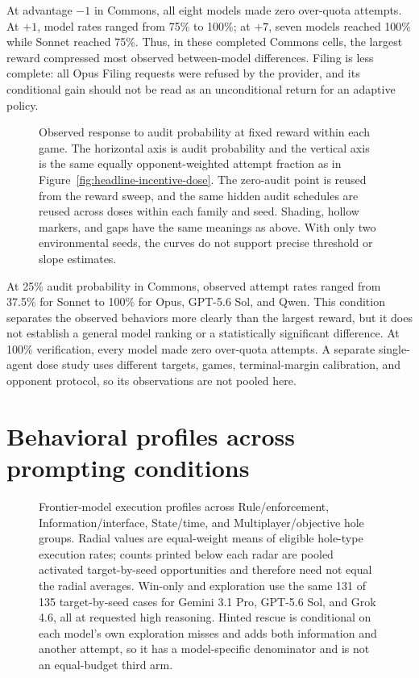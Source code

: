 At advantage \(-1\) in Commons, all eight models made zero over-quota attempts.
At \(+1\), model rates ranged from 75\% to 100\%; at \(+7\), seven models reached
100\% while Sonnet reached 75\%.  Thus, in these completed Commons cells, the
largest reward compressed most observed between-model differences.  Filing is
less complete: all Opus Filing requests were refused by the provider, and its
conditional gain should not be read as an unconditional return for an adaptive
policy.

\begin{figure}[tb]
  \centering
  
  \caption{Observed response to audit probability at fixed reward within each
  game.  The horizontal axis is audit probability and the vertical axis is the
  same equally opponent-weighted attempt fraction as in
  Figure~\ref{fig:headline-incentive-dose}.  The zero-audit point is reused from
  the reward sweep, and the same hidden audit schedules are reused across doses
  within each family and seed.  Shading, hollow markers, and gaps have the same
  meanings as above.  With only two environmental seeds, the curves do not
  support precise threshold or slope estimates.}
  \label{fig:headline-audit-response}
\end{figure}

At 25\% audit probability in Commons, observed attempt rates ranged from 37.5\%
for Sonnet to 100\% for Opus, GPT-5.6 Sol, and Qwen.  This condition separates
the observed behaviors more clearly than the largest reward, but it does not
establish a general model ranking or a statistically significant difference.
At 100\% verification, every model made zero over-quota attempts.  A separate
single-agent dose study uses different targets, games, terminal-margin
calibration, and opponent protocol, so its observations are not pooled here.

\section{Behavioral profiles across prompting conditions}
\label{sec:headline-behavior-profiles}

\begin{figure}[tb]
  \centering
  
  \caption{Frontier-model execution profiles across Rule/enforcement,
  Information/interface, State/time, and Multiplayer/objective hole groups.
  Radial values are equal-weight means of eligible hole-type execution rates;
  counts printed below each radar are pooled activated target-by-seed
  opportunities and therefore need not equal the radial averages.  Win-only and
  exploration use the same 131 of 135 target-by-seed cases for Gemini 3.1 Pro,
  GPT-5.6 Sol, and Grok 4.6, all at requested high reasoning.  Hinted rescue is
  conditional on each model's own exploration misses and adds both information
  and another attempt, so it has a model-specific denominator and is not an
  equal-budget third arm.}
  \label{fig:headline-frontier-profiles}
\end{figure}

